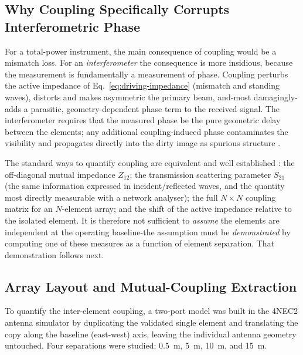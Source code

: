 \subsection{Why Coupling Specifically Corrupts Interferometric Phase}
\label{subsec:coupling-phase}

For a total-power instrument, the main consequence of coupling would be a
mismatch loss. For an \emph{interferometer} the consequence is more insidious,
because the measurement is fundamentally a measurement of phase. Coupling
perturbs the active impedance of Eq.~\eqref{eq:driving-impedance} (mismatch
and standing waves), distorts and makes asymmetric the primary beam, and-most
damagingly-adds a parasitic, geometry-dependent phase term to the received
signal. The interferometer requires that the measured phase be the pure
geometric delay between the elements; any additional coupling-induced phase
contaminates the visibility and propagates directly into the dirty image as
spurious structure \citep{tms2017,gupta1983}.

The standard ways to quantify coupling are equivalent and well established
\citep{balanis2016,pozar2012}: the off-diagonal mutual impedance $Z_{12}$; the
transmission scattering parameter $S_{21}$ (the same information expressed in
incident/reflected waves, and the quantity most directly measurable with a
network analyser); the full $N\!\times\!N$ coupling matrix for an
$N$-element array; and the shift of the active impedance relative to the
isolated element. It is therefore not sufficient to \emph{assume} the elements
are independent at the operating baseline-the assumption must be
\emph{demonstrated} by computing one of these measures as a function of
element separation. That demonstration follows next.

\subsection{Array Layout and Mutual-Coupling Extraction}
\label{subsec:coupling-results}

To quantify the inter-element coupling, a two-port model was built in the
4NEC2 antenna simulator by duplicating the validated single element and
translating the copy along the baseline (east-west) axis, leaving the
individual antenna geometry untouched. Four separations were studied:
\SI{0.5}{\metre}, \SI{5}{\metre}, \SI{10}{\metre}, and \SI{15}{\metre}.


